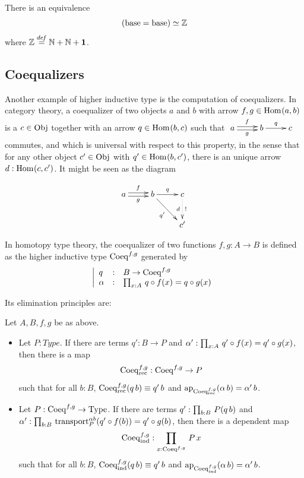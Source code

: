 \begin{prop}
  There is an equivalence
  \[ (\mathrm{base} = \mathrm{base}) \simeq \mathbb{Z} \]
  where $\mathbb{Z} \overset{de\hspace{-0.2ex}f}{=} \mathbb{N}+\mathbb{N}+\mathbf{1}$.
\end{prop}

\subsection{Coequalizers}
\label{ssec:coeq}

Another example of higher inductive type is the computation of
coequalizers. In category theory, a coequalizer of two objects $a$ and
$b$ with arrow $f,g\in\mathrm{Hom}_{}(a,b)$ is a $c\in\mathrm{Obj}$ together with an arrow
$q\in\mathrm{Hom}_{}(b,c)$ such that $\xymatrix{
    a \ar@<2pt>[r]^f \ar@<-2pt>[r]_g& b \ar[r]^q & c}$ commutes, and which is universal with respect to this property, in
the sense that for any other object $c'\in\mathrm{Obj}$ with
$q'\in\mathrm{Hom}_{}(b,c')$, there is an unique arrow $d:\mathrm{Hom}_{}(c,c')$. It
might be seen as the diagram

\[ 
  \xymatrix{
    a \ar@<2pt>[r]^f \ar@<-2pt>[r]_g& b \ar[r]^q \ar[rd]_{q'} & c\ar@{.>}[d]^-{!}_-{d} \\
    & & c'
  }
\]

In homotopy type theory, the coequalizer of two functions $f,g:A\to
B$ is defined as the higher inductive type $\mathrm{Coeq}^{f,g}$ generated by
\[
  \left| 
    \begin{array}{lll}
      q&:& B \to \mathrm{Coeq}^{f,g} \\
      \alpha&:& \prod_{x:A}\, q\circ f(x) = q\circ g(x)
    \end{array}
  \right.
\]

Its elimination principles are:
\begin{lem}
  Let $A,B,f,g$ be as above. 
  \begin{itemize}
  \item Let $P:Type$. If there are terms $q':B\to P$ and
    $\alpha':\prod_{x:A}\, q'\circ f (x) = q'\circ g (x)$, then there is
    a map
    \[ \mathrm{Coeq}^{f,g}_{\mathrm{rec}}: \mathrm{Coeq}^{f,g} \to P \]
    such that for all $b:B$, $\mathrm{Coeq}^{f,g}_{\mathrm{rec}}(q\,  b) \equiv
    q'\, b$ and $\mathrm{ap}_{\mathrm{Coeq}^{f,g}_{\mathrm{rec}}}(\alpha\, b) =
    \alpha'\, b$.
  \item Let $P:\mathrm{Coeq}^{f,g} \to \operatorname{Type}$. If there are terms $q':\prod_{b:B}\, P(q\, b)$ and $\alpha':\prod_{b:B}\, \operatorname{transport}_P^{\alpha
        b}(q'\circ f(b)) = q'\circ g(b)$, then there is a dependent
      map
      \[ \mathrm{Coeq}^{f,g}_{\mathrm{ind}}: \prod_{x:\mathrm{Coeq}^{f,g}}\, P\, x\]
      such that for all $b:B$, $\mathrm{Coeq}^{f,g}_{\mathrm{ind}}(q\, b) \equiv
      q'\, b$ and $\mathrm{ap}_{\mathrm{Coeq}^{f,g}_{\mathrm{ind}}}(\alpha\, b) =
      \alpha'\, b$.
  \end{itemize}
\end{lem}

